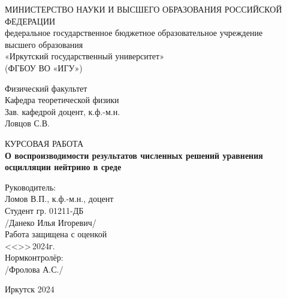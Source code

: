 \documentclass[a4paper,12pt]{article}
\begin{document}
\onehalfspacing
\pagestyle{plain}

\begin{titlepage}
	\begin{center}%
		МИНИСТЕРСТВО НАУКИ И ВЫСШЕГО ОБРАЗОВАНИЯ РОССИЙСКОЙ ФЕДЕРАЦИИ\\
		федеральное государственное бюджетное образовательное учреждение\\
		высшего образования \\
		«Иркутский государственный университет»\\
		(ФГБОУ ВО «ИГУ»)\\
	\end{center}
	\vspace*{3em}
	
	\begin{flushright}
		\begin{minipage}{92mm}
			Физический факультет\\
			Кафедра теоретической физики\\
			Зав. кафедрой доцент, к.ф.-м.н.\\
			Ловцов С.В.\;\underline{\hspace{35mm}}
		\end{minipage}
	\end{flushright}
	\vspace*{4em}
	
	\begin{center}
		\Large%
		КУРСОВАЯ РАБОТА\\[1em]
		\bfseries%
		О воспроизводимости результатов численных решений уравнения осцилляции нейтрино в среде
	\end{center}
	
	\vspace*{3em}
	
	\begin{flushright}
		\begin{minipage}{92mm}
			Руководитель: \underline{\hspace{35mm}}\\
			Ломов В.П., к.ф.-м.н., доцент\\[2ex]
			Студент гр. 01211-ДБ\\
			\underline{\hspace{35mm}}/Данеко Илья Игоревич/\\[2ex]
			Работа защищена с оценкой \underline{\hspace{25mm}}\\
			<<\underline{\hspace{8mm}}>>\underline{\hspace{22mm}}\,2024г.\\
			Нормконтролёр:\\
			\underline{\hspace{35mm}}/Фролова А.С./\\
		\end{minipage}
	\end{flushright}
	
	\vfill
	\begin{center}
		Иркутск 2024
	\end{center}
\end{titlepage}
\end{document}
